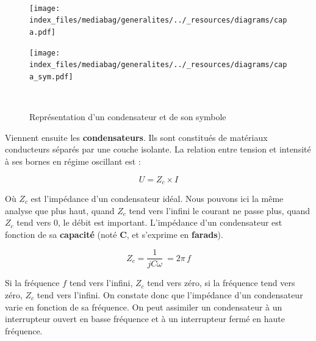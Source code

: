 \documentclass[
  letterpaper,
  DIV=11,
  numbers=noendperiod]{scrreprt}
\begin{document}
\begin{figure}

\begin{minipage}[b]{0.10\linewidth}

{\centering 

~

}

\end{minipage}%
%
\begin{minipage}[b]{0.40\linewidth}

{\centering 

\texttt{[image: index\_files/mediabag/generalites/../\_resources/diagrams/capa.pdf]}

}

\end{minipage}%
%
\begin{minipage}[b]{0.40\linewidth}

{\centering 

\texttt{[image: index\_files/mediabag/generalites/../\_resources/diagrams/capa\_sym.pdf]}

}

\end{minipage}%
%
\begin{minipage}[b]{0.10\linewidth}

{\centering 

~

}

\end{minipage}%

\caption{\label{fig-capa}Représentation d'un condensateur et de son
symbole}

\end{figure}

Viennent ensuite les \textbf{condensateurs}. Ils sont constitués de
matériaux conducteurs séparés par une couche isolante. La relation entre
tension et intensité à ses bornes en régime oscillant est :

\[ U = Z_c \times I \]

Où \(Z_c\) est l'impédance d'un condensateur idéal. Nous pouvons ici la
même analyse que plus haut, quand \(Z_c\) tend vers l'infini le courant
ne passe plus, quand \(Z_c\) tend vers 0, le débit est important.
L'impédance d'un condensateur est fonction de sa \textbf{capacité} (noté
\textbf{C}, et s'exprime en \textbf{farads}).

\[ Z_c = \frac{1}{jC\omega} \> = 2 \pi \, f\]

Si la fréquence \(f\) tend vers l'infini, \(Z_c\) tend vers zéro, si la
fréquence tend vers zéro, \(Z_c\) tend vers l'infini. On constate donc
que l'impédance d'un condensateur varie en fonction de sa fréquence. On
peut assimiler un condensateur à un interrupteur ouvert en basse
fréquence et à un interrupteur fermé en haute fréquence.
\end{document}
